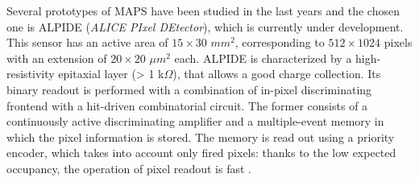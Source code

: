 Several prototypes of MAPS have been studied in the last years and the chosen one is ALPIDE (\textit{ALICE PIxel DEtector}), which is currently under development. This sensor has an active area of $15\times30 $ $mm^2$, corresponding to $512 \times 1024$ pixels with an extension of $20\times20$ $\mu m^2$ each. ALPIDE is characterized by a high-resistivity epitaxial layer (> 1 k$\Omega$), that allows a good charge collection. Its binary readout is performed with a combination of in-pixel discriminating frontend with a hit-driven combinatorial circuit. The former consists of a continuously active discriminating amplifier and a multiple-event memory in which the pixel information is stored. The memory is read out using a priority encoder, which takes into account only fired pixels: thanks to the low expected occupancy, the operation of pixel readout is fast \cite{alpide}.
